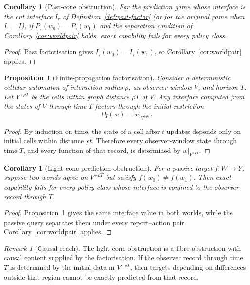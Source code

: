 \documentclass[11pt]{article}
\theoremstyle{plain}
\newtheorem{proposition}[theorem]{Proposition}
\newtheorem{corollary}[theorem]{Corollary}
\theoremstyle{definition}
\theoremstyle{remark}
\newtheorem{remark}[theorem]{Remark}
\begin{document}
\begin{corollary}[Past-cone obstruction]\label{cor:pastcone}
For the prediction game whose interface is the cut interface $I_\tau$ of Definition~\ref{def:past-factor}
(or for the original game when $I_\tau=I$), if $P_\tau(w_0)=P_\tau(w_1)$ and
the separation condition of Corollary~\ref{cor:worldpair} holds, exact
capability fails for every policy class.
\end{corollary}

\begin{proof}
Past factorisation gives $I_\tau(w_0)=I_\tau(w_1)$, so
Corollary~\ref{cor:worldpair} applies.
\end{proof}

\begin{proposition}[Finite-propagation factorisation]\label{prop:lightcone}
Consider a deterministic cellular automaton of interaction radius $\rho$, an
observer window $V$, and horizon $T$. Let
$V^{+\rho T}$ be the cells within graph distance $\rho T$ of $V$. Any interface
computed from the states of $V$ through time $T$ factors through the initial
restriction
\[
P_T(w)=w|_{V^{+\rho T}}.
\]
\end{proposition}

\begin{proof}
By induction on time, the state of a cell after $t$ updates depends only on
initial cells within distance $\rho t$. Therefore every observer-window state
through time $T$, and every function of that record, is determined by
$w|_{V^{+\rho T}}$.
\end{proof}

\begin{corollary}[Light-cone prediction obstruction]\label{cor:lightcone}
For a passive target $f:W\to Y$, suppose two worlds agree on
$V^{+\rho T}$ but satisfy $f(w_0)\ne f(w_1)$. Then exact capability fails for
every policy class whose interface is confined to the observer record through
$T$.
\end{corollary}

\begin{proof}
Proposition~\ref{prop:lightcone} gives the same interface value in both worlds,
while the passive query separates them under every report--action pair.
Corollary~\ref{cor:worldpair} applies.
\end{proof}

\begin{remark}[Causal reach]
The light-cone obstruction is a fibre obstruction with causal content supplied by
the factorisation. If the observer record through time $T$ is determined by the
initial data in $V^{+\rho T}$, then targets depending on differences outside that
region cannot be exactly predicted from that record.
\end{remark}
\end{document}
